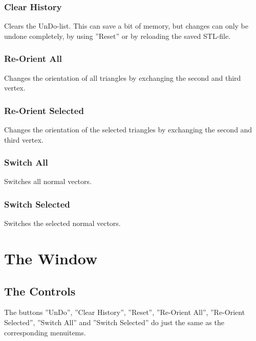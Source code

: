 \subsection{Clear History}
Clears the UnDo-list. This can save a bit of memory, but changes can only be undone completely, by using ''Reset'' or by reloading the saved STL-file.

\subsection{Re-Orient All}
Changes the orientation of all triangles by exchanging the second and third vertex.

\subsection{Re-Orient Selected}
Changes the orientation of the selected triangles by exchanging the second and third vertex.

\subsection{Switch All}
Switches all normal vectors.

\subsection{Switch Selected}
Switches the selected normal vectors.

\chapter{The Window}

\section{The Controls}

The buttons ''UnDo'', ''Clear History'', ''Reset'', ''Re-Orient All'', ''Re-Orient Selected'', ''Switch All'' and ''Switch Selected'' do just the same as the cor\-responding menuitems. 

